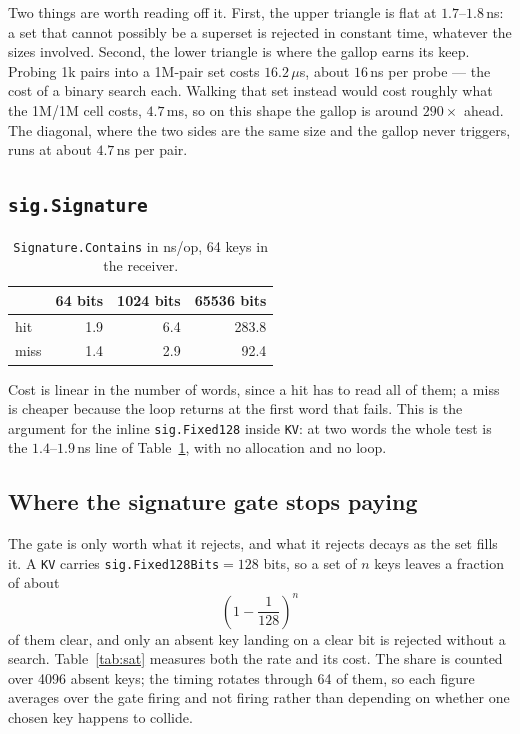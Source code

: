 \documentclass[11pt]{article}
\newcommand{\code}[1]{\texttt{#1}}
\begin{document}
Two things are worth reading off it. First, the upper triangle is flat at
$1.7$--$1.8$\,ns: a set that cannot possibly be a superset is rejected in
constant time, whatever the sizes involved. Second, the lower triangle is where
the gallop earns its keep. Probing 1k pairs into a 1M-pair set costs
$16.2\,\mu$s, about $16$\,ns per probe --- the cost of a binary search each.
Walking that set instead would cost roughly what the 1M/1M cell costs,
$4.7$\,ms, so on this shape the gallop is around $290\times$ ahead. The
diagonal, where the two sides are the same size and the gallop never triggers,
runs at about $4.7$\,ns per pair.

\subsection{\code{sig.Signature}}

\begin{table}[h]
\centering
\begin{tabular}{lrrr}
\hline
 & 64 bits & 1024 bits & 65536 bits \\
\hline
hit  & 1.9 & 6.4 & 283.8 \\
miss & 1.4 & 2.9 &  92.4 \\
\hline
\end{tabular}
\caption{\code{Signature.Contains} in ns/op, 64 keys in the receiver.}
\label{tab:sig}
\end{table}

Cost is linear in the number of words, since a hit has to read all of them; a
miss is cheaper because the loop returns at the first word that fails. This is
the argument for the inline \code{sig.Fixed128} inside \code{KV}: at two words the
whole test is the $1.4$--$1.9$\,ns line of Table~\ref{tab:sig}, with no
allocation and no loop.

\subsection{Where the signature gate stops paying}

The gate is only worth what it rejects, and what it rejects decays as the set
fills it. A \code{KV} carries \code{sig.Fixed128Bits}${} = 128$ bits, so a set
of $n$ keys leaves a fraction of about
\[
  \left(1 - \frac{1}{128}\right)^{n}
\]
of them clear, and only an absent key landing on a clear bit is rejected without
a search. Table~\ref{tab:sat} measures both the rate and its cost. The share is
counted over 4096 absent keys; the timing rotates through 64 of them, so each
figure averages over the gate firing and not firing rather than depending on
whether one chosen key happens to collide.
\end{document}
